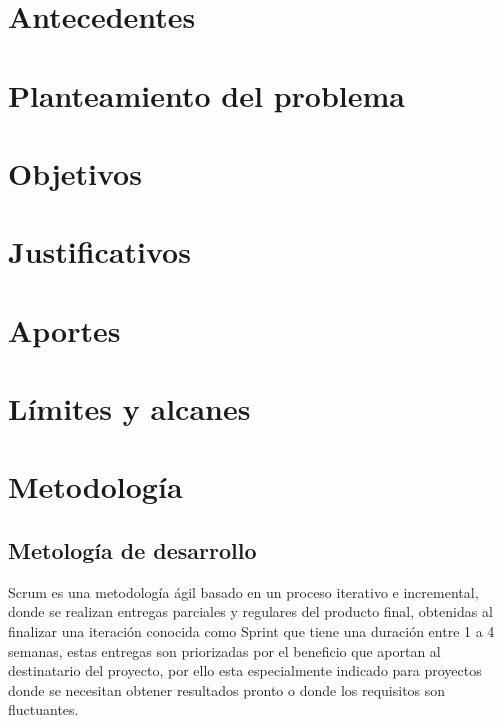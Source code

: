 \section{Antecedentes}
\section{Planteamiento del problema}
\section{Objetivos}
\section{Justificativos}
\section{Aportes}
\section{L\'imites y alcanes}

\section{Metodolog\'ia}
\subsection{Metolog\'ia de desarrollo}
Scrum es una metodolog\'ia \'agil basado en un proceso iterativo e incremental, 
donde se realizan entregas parciales y regulares del producto final, obtenidas al
finalizar una iteraci\'on conocida como Sprint que tiene una duraci\'on entre 1 a 4
semanas, estas entregas son priorizadas por el beneficio que aportan al destinatario 
del proyecto, por ello esta especialmente indicado para proyectos donde se necesitan 
obtener resultados pronto o donde los requisitos son fluctuantes.


